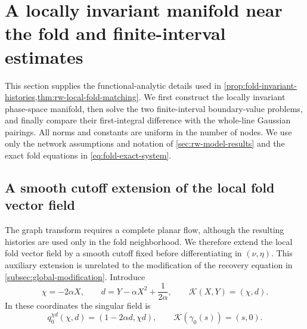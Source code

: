 \section{A locally invariant manifold near the fold and finite-interval estimates}
\label{subsec:invariant-history-details}

This section supplies the functional-analytic details used in
\cref{prop:fold-invariant-histories,thm:rw-local-fold-matching}.  We first
construct the locally invariant phase-space manifold, then solve the two
finite-interval boundary-value problems, and finally compare their
first-integral difference with the whole-line Gaussian pairings.  All norms
and constants are uniform in the number of nodes.  We use only the network
assumptions and notation of \cref{sec:rw-model-results} and the exact fold
equations in \cref{eq:fold-exact-system}.

\subsection{A smooth cutoff extension of the local fold vector field}

The graph transform requires a complete planar flow, although the resulting
histories are used only in the fold neighborhood.  We therefore extend the
local fold vector field by a smooth cutoff fixed before differentiating in
\((\nu,\eta)\).  This auxiliary extension is unrelated to the modification of
the recovery equation in \cref{subsec:global-modification}.
Introduce
\begin{equation}
 \chi=-2\alpha X,\qquad
 d=Y-\alpha X^2+\frac1{2\alpha},\qquad
 \mathcal K(X,Y)=(\chi,d).
 \label{eq:supp-fold-coordinates}
\end{equation}
In these coordinates the singular field is
\begin{equation}
 q_0^{\chi d}(\chi,d)=(1-2\alpha d,\chi d),
 \qquad \mathcal K(\gamma_0(s))=(s,0).
 \label{eq:supp-singular-field-chi-d}
\end{equation}

